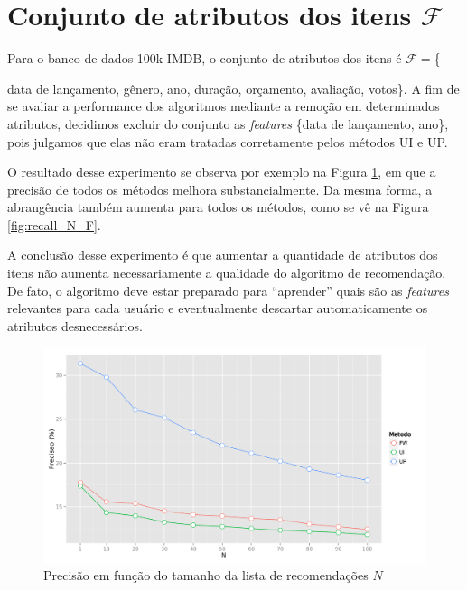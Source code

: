 \section{Conjunto de atributos dos itens
 $\mathcal{F}$} %
\label{sec:conjunto_de_atributos_dos_itens_}

Para o banco de dados 100k-IMDB, o conjunto de atributos dos itens é $\mathcal{F}=$\{{data de lançamento, gênero, ano, duração, orçamento, avaliação, votos\}. A fim de se avaliar a performance dos algoritmos mediante a remoção em determinados atributos, decidimos excluir do conjunto as \textit{features} \{data de lançamento, ano\}, pois julgamos que elas não eram tratadas corretamente pelos métodos UI e UP. 

O resultado desse experimento se observa por exemplo na Figura \ref{fig:precision_N_F}, em que a precisão de todos os métodos melhora substancialmente. Da mesma forma, a abrangência também aumenta para todos os métodos, como se vê na Figura \ref{fig:recall_N_F}.

A conclusão desse experimento é que aumentar a quantidade de atributos dos itens não aumenta necessariamente a qualidade do algoritmo de recomendação. De fato, o algoritmo deve estar preparado para ``aprender'' quais são as \textit{features} relevantes para cada usuário e eventualmente descartar automaticamente os atributos desnecessários.

\begin{figure}[htp]
    \begin{center}
    \includegraphics[width=1\textwidth]{img/precision_N_F}
    \end{center}
    \caption{Precisão em função do tamanho da lista de recomendações $N$}
    \label{fig:precision_N_F}
\end{figure}


}
